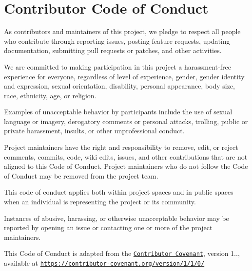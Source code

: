 \chapter{Contributor Code of Conduct }
\hypertarget{md_lib_2libwconr_2build_2__deps_2curl-src_2docs_2CODE__OF__CONDUCT}{}\label{md_lib_2libwconr_2build_2__deps_2curl-src_2docs_2CODE__OF__CONDUCT}
As contributors and maintainers of this project, we pledge to respect all people who contribute through reporting issues, posting feature requests, updating documentation, submitting pull requests or patches, and other activities.

We are committed to making participation in this project a harassment-\/free experience for everyone, regardless of level of experience, gender, gender identity and expression, sexual orientation, disability, personal appearance, body size, race, ethnicity, age, or religion.

Examples of unacceptable behavior by participants include the use of sexual language or imagery, derogatory comments or personal attacks, trolling, public or private harassment, insults, or other unprofessional conduct.

Project maintainers have the right and responsibility to remove, edit, or reject comments, commits, code, wiki edits, issues, and other contributions that are not aligned to this Code of Conduct. Project maintainers who do not follow the Code of Conduct may be removed from the project team.

This code of conduct applies both within project spaces and in public spaces when an individual is representing the project or its community.

Instances of abusive, harassing, or otherwise unacceptable behavior may be reported by opening an issue or contacting one or more of the project maintainers.

This Code of Conduct is adapted from the \href{https://contributor-covenant.org/}{\texttt{Contributor Covenant}}, version 1.., available at \href{https://contributor-covenant.org/version/1/1/0/}{\texttt{https\+://contributor-\/covenant.\+org/version/1/1/0/}} 